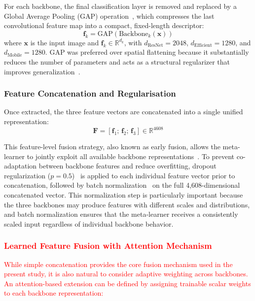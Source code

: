 \documentclass[pdflatex,sn-basic]{sn-jnl}
\begin{document}
For each backbone, the final classification layer is removed and replaced by a Global Average Pooling (GAP) operation~\cite{lin2013network}, which compresses the last convolutional feature map into a compact, fixed-length descriptor:
\begin{equation}
    \mathbf{f}_k = \mathrm{GAP}\!\left(\mathrm{Backbone}_k(\mathbf{x})\right)
    \label{eq:feature_extraction}
\end{equation}
where $\mathbf{x}$ is the input image and $\mathbf{f}_k \in \mathbb{R}^{d_k}$, with $d_{\text{ResNet}} = 2048$, $d_{\text{Efficient}} = 1280$, and $d_{\text{Mobile}} = 1280$. GAP was preferred over spatial flattening because it substantially reduces the number of parameters and acts as a structural regularizer that improves generalization~\cite{lin2013network}.

\subsubsection{Feature Concatenation and Regularisation}

Once extracted, the three feature vectors are concatenated into a single unified representation:
\begin{equation}
    \mathbf{F} = [\mathbf{f}_1;\, \mathbf{f}_2;\, \mathbf{f}_3] \in \mathbb{R}^{4608}
    \label{eq:concatenation}
\end{equation}

This feature-level fusion strategy, also known as early fusion, allows the meta-learner to jointly exploit all available backbone representations~\cite{ramachandram2017deep}. To prevent co-adaptation between backbone features and reduce overfitting, dropout regularization ($p = 0.5$)~\cite{srivastava2014dropout} is applied to each individual feature vector prior to concatenation, followed by batch normalization~\cite{ioffe2015batch} on the full 4,608-dimensional concatenated vector. This normalization step is particularly important because the three backbones may produce features with different scales and distributions, and batch normalization ensures that the meta-learner receives a consistently scaled input regardless of individual backbone behavior.

\subsubsection{\textcolor{red}{Learned Feature Fusion with Attention Mechanism}}

\textcolor{red}{While simple concatenation provides the core fusion mechanism used in the present study, it is also natural to consider adaptive weighting across backbones. An attention-based extension can be defined by assigning trainable scalar weights to each backbone representation:}
\end{document}

